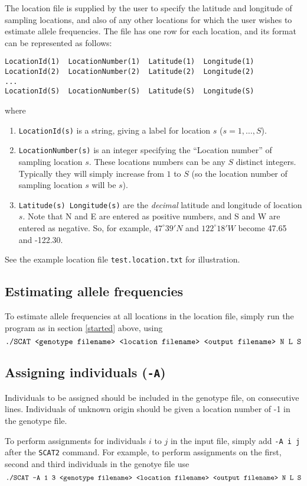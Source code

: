 \documentclass[11pt,titlepage,times,letterpaper]{article}
\def\SCAT{{\tt SCAT2} }
\begin{document}
The location file is supplied by the user to specify the latitude and
longitude of sampling locations, and also of any other locations
for which the user wishes to estimate allele frequencies.
The file has one row for each location, and its format 
can be represented as follows:
\begin{verbatim}
LocationId(1)  LocationNumber(1)  Latitude(1)  Longitude(1)
LocationId(2)  LocationNumber(2)  Latitude(2)  Longitude(2)
...
LocationId(S)  LocationNumber(S)  Latitude(S)  Longitude(S)
\end{verbatim}
where
\begin{enumerate}
\item{\tt LocationId(s)} is a string, giving a label for location $s$
($s = 1,\dots,S$).
\item{\tt LocationNumber(s)} is an integer specifying the ``Location
number'' of sampling location $s$. These locations numbers can be
any $S$ distinct integers. Typically they will simply increase from $1$ to $S$
(so the location number of sampling location $s$ will be $s$). 
\item{{\tt Latitude(s) Longitude(s)}} are the {\it decimal} latitude
and longitude of location $s$. Note that N and E are entered as
positive numbers, and S and W are entered as negative. So, for
example, $47^\circ 39' N$ and $122^\circ 18' W$ become 47.65 and -122.30.
\end{enumerate}
See the example location file {\tt test.location.txt} for illustration.

\subsection{Estimating allele frequencies}

To estimate allele frequencies at all locations in the location
file, simply run the program as in section \ref{started} above,
using
$$\text{{\tt ./SCAT <genotype filename> <location filename> <output
filename> N L S}}$$

\subsection{Assigning individuals ({\tt -A})} \label{assign}

Individuals to be assigned should be included in the genotype file, on
consecutive lines. Individuals of unknown origin should be given a
location number of -1 in the genotype file.  

To perform assignments for individuals $i$ to $j$ in the input file,
simply add {\tt -A i j} after the \SCAT command. For example, to
perform assignments on the first, second and third individuals in the
genotye file use
$$\text{\tt ./SCAT -A 1 3 <genotype filename> <location filename> <output
filename> N L S}$$
\end{document}
